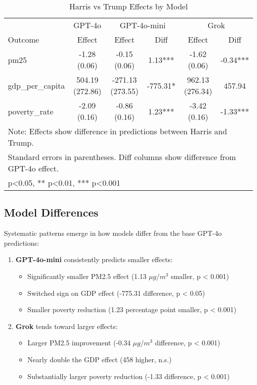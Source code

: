 \begin{table}[htbp]
    \centering
    \caption{Harris vs Trump Effects by Model}
    \begin{tabular}{lccccc}
    \hline
    & \multicolumn{1}{c}{GPT-4o} & \multicolumn{2}{c}{GPT-4o-mini} & \multicolumn{2}{c}{Grok} \\
    Outcome & Effect & Effect & Diff & Effect & Diff \\
    \hline
    pm25 & -1.28 (0.06) & -0.15 (0.06) & 1.13*** & -1.62 (0.06) & -0.34*** \\
    gdp\_per\_capita & 504.19 (272.86) & -271.13 (273.55) & -775.31* & 962.13 (276.34) & 457.94 \\
    poverty\_rate & -2.09 (0.16) & -0.86 (0.16) & 1.23*** & -3.42 (0.16) & -1.33*** \\
    \hline
    \multicolumn{6}{p{0.95\textwidth}}{\small Note: Effects show difference in predictions between Harris and Trump.} \\
    \multicolumn{6}{p{0.95\textwidth}}{\small Standard errors in parentheses. Diff columns show difference from GPT-4o effect.} \\
    \multicolumn{6}{p{0.95\textwidth}}{\small * p<0.05, ** p<0.01, *** p<0.001} \\
    \end{tabular}
    \label{tab:model_comparison}
\end{table}

\subsection{Model Differences}

Systematic patterns emerge in how models differ from the base GPT-4o predictions:

\begin{enumerate}
    \item \textbf{GPT-4o-mini} consistently predicts smaller effects:
    \begin{itemize}
        \item Significantly smaller PM2.5 effect (1.13 $\mu g/m^3$ smaller, p < 0.001)
        \item Switched sign on GDP effect (-775.31 difference, p < 0.05)
        \item Smaller poverty reduction (1.23 percentage point smaller, p < 0.001)
    \end{itemize}

    \item \textbf{Grok} tends toward larger effects:
    \begin{itemize}
        \item Larger PM2.5 improvement (-0.34 $\mu g/m^3$ difference, p < 0.001)
        \item Nearly double the GDP effect (458 higher, n.s.)
        \item Substantially larger poverty reduction (-1.33 difference, p < 0.001)
    \end{itemize}
\end{enumerate}

